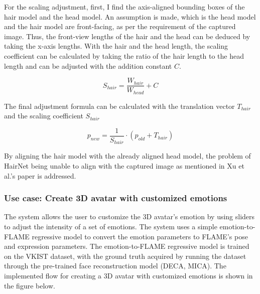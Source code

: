 For the scaling adjustment, first, I find the axis-aligned bounding boxes of the hair model and the head model. An assumption is made, which is the head model and the hair model are front-facing, as per the requirement of the captured image. Thus, the front-view lengths of the hair and the head can be deduced by taking the x-axis lengths. With the hair and the head length, the scaling coefficient can be calculated by taking the ratio of the hair length to the head length and can be adjusted with the addition constant $C$.

\begin{equation}
    S_{hair} = \frac{W_{hair}}{W_{head}} + C
\end{equation}

The final adjustment formula can be calculated with the translation vector $T_{hair}$ and the scaling coefficient $S_{hair}$

\begin{equation}
    p_{new} = \frac{1}{S_{hair}}\cdot(p_{old} + T_{hair})
\end{equation}

By aligning the hair model with the already aligned head model, the problem of HairNet being unable to align with the captured image as mentioned in Xu et al.'s paper \cite{xuDeep3DPortrait2020} is addressed.





\subsubsection{Use case: Create 3D avatar with customized emotions}


The system allows the user to customize the 3D avatar's emotion by using sliders to adjust the intensity of a set of emotions. The system uses a simple emotion-to-FLAME regressive model to convert the emotion parameters to FLAME's pose and expression parameters. The emotion-to-FLAME regressive model is trained on the VKIST dataset, with the ground truth acquired by running the dataset through the pre-trained face reconstruction model (DECA, MICA). The implemented flow for creating a 3D avatar with customized emotions is shown in the figure below.

\clearpage

